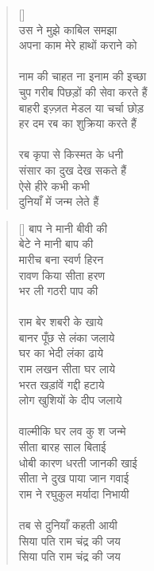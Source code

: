 \begin{verse}[\versewidth]
{\\
उस ने मुझे काबिल समझा\\
अपना काम मेरे हाथों कराने को\\
\\
नाम की चाहत ना इनाम की इच्छा\\
चुप गरीब पिछड़ों की सेवा करते हैं\\
बाहरी इज़्ज़त मेडल या चर्चा छोड़\\
हर दम रब का शुक्रिया करते हैं\\
\\
रब कृपा से किस्मत के धनी\\
संसार का दुख देख सकते हैं\\
ऐसे हीरे कभी कभी\\
दुनियाँ में जन्म लेते हैं
}\end{verse}

\begin{verse}[\versewidth]\texthindi{
बाप ने मानी बीवी की\\
बेटे ने मानी बाप की\\
मारीच बना स्वर्ण हिरन\\
रावण किया सीता हरण\\
भर ली गठरी पाप की\\
 \\
राम बेर शबरी के खाये\\
बानर पूँछ से लंका जलाये\\
घर का भेदी लंका ढाये\\
राम लखन सीता घर लाये\\
भरत खड़ांवें गद्दी हटाये\\
लोग खुशियों के दीप जलाये\\
\\
वाल्मीकि घर लव कु श जन्मे\\
सीता बारह साल बिताई\\
धोबी कारण धरती जानकी खाई\\
सीता ने दुख पाया जान गवाई\\
राम ने रघुकुल मर्यादा निभायी\\
\\
तब से दुनियाँ कहती आयी\\
सिया पति राम चंद्र की जय\\
सिया पति राम चंद्र की जय\\
}\end{verse}

